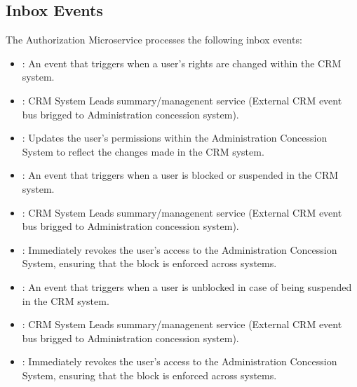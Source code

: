 \documentclass[letterpaper,10pt,english]{sphinxmanual}
\begin{document}
\subsection{Inbox Events}
\label{\detokenize{crm_system/authorization_service:inbox-events}}
\sphinxAtStartPar
The Authorization Microservice processes the following inbox events:

\sphinxAtStartPar
{}
\begin{itemize}
\item {} 
\sphinxAtStartPar
{}: An event that triggers when a user’s rights are changed within the CRM system.

\item {} 
\sphinxAtStartPar
{}: CRM System \textendash{} Leads summary/managenent service (External CRM event bus brigged to Administration concession system).

\item {} 
\sphinxAtStartPar
{}: Updates the user’s permissions within the Administration Concession System to reflect the changes made in the CRM system.

\end{itemize}

\sphinxAtStartPar
{}
\begin{itemize}
\item {} 
\sphinxAtStartPar
{}: An event that triggers when a user is blocked or suspended in the CRM system.

\item {} 
\sphinxAtStartPar
{}: CRM System \textendash{} Leads summary/managenent service  (External CRM event bus brigged to Administration concession system).

\item {} 
\sphinxAtStartPar
{}: Immediately revokes the user’s access to the Administration Concession System, ensuring that the block is enforced across systems.

\end{itemize}

\sphinxAtStartPar
{}
\begin{itemize}
\item {} 
\sphinxAtStartPar
{}: An event that triggers when a user is unblocked in case of being suspended in the CRM system.

\item {} 
\sphinxAtStartPar
{}: CRM System \textendash{} Leads summary/managenent service  (External CRM event bus brigged to Administration concession system).

\item {} 
\sphinxAtStartPar
{}: Immediately revokes the user’s access to the Administration Concession System, ensuring that the block is enforced across systems.

\end{itemize}
\end{document}
